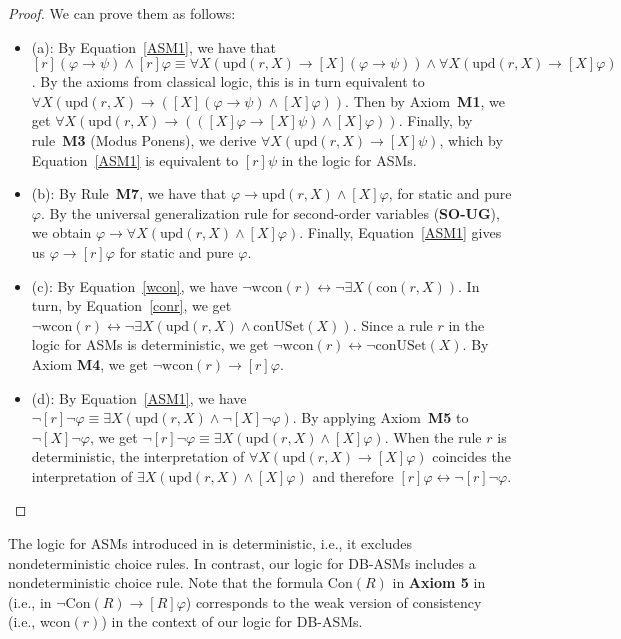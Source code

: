 \documentclass[preprint,11pt]{elsarticle}
\theoremstyle{definition}
\theoremstyle{remark}
\begin{document}
\begin{proof} We can prove them as follows:
\begin{itemize}
  \item (a): By Equation~\ref{ASM1}, we have that $[r](\varphi\rightarrow\psi)\wedge [r]\varphi \equiv \forall X (\mathrm{upd}(r,X)\rightarrow [X](\varphi\rightarrow\psi)) \wedge \forall X (\mathrm{upd}(r,X)\rightarrow [X]\varphi)$. By the axioms from classical logic, this is in turn equivalent to $\forall X (\mathrm{upd}(r,X)\rightarrow([X](\varphi\rightarrow\psi)\wedge[X]\varphi))$.
Then by Axiom~\textbf{M1}, we get $\forall X (\mathrm{upd}(r,X)\rightarrow(([X]\varphi \rightarrow [X]\psi) \wedge [X]\varphi))$. Finally, by rule~\textbf{M3} (Modus Ponens), we derive $\forall X (\mathrm{upd}(r,X)\rightarrow [X]\psi)$, which by Equation~\ref{ASM1} is equivalent to $[r]\psi$ in the logic for ASMs.
  \item (b): By Rule~\textbf{M7}, we have that $\varphi\rightarrow \mathrm{upd}(r, X) \wedge [X]\varphi$, for
  static and pure $\varphi$. By the universal generalization rule for second-order variables (\textbf{SO-UG}), we obtain $\varphi\rightarrow \forall X(\mathrm{upd}(r, X) \wedge [X]\varphi)$. Finally, Equation~\ref{ASM1} gives us $\varphi\rightarrow [r]\varphi$ for static and pure $\varphi$.
  \item (c): By Equation~\ref{wcon}, we have $\neg \mathrm{wcon}(r)\leftrightarrow \neg\exists
  X (\mathrm{con}(r,X))$. In turn, by Equation~\ref{conr}, we get $\neg \mathrm{wcon}(r) \leftrightarrow \neg \exists X (\mathrm{upd}(r,X)\wedge \mathrm{conUSet}(X))$.
  Since a rule $r$ in the logic for ASMs is deterministic, we get $\neg \mathrm{wcon}(r)\leftrightarrow \neg \mathrm{conUSet}(X)$. By Axiom \textbf{M4}, we get $\neg \mathrm{wcon}(r)\rightarrow
  [r]\varphi$.
  \item (d): By Equation~\ref{ASM1}, we have $\neg[r]\neg\varphi \equiv \exists X(\mathrm{upd}(r,X)\wedge \neg[X]\neg\varphi)$. By applying Axiom~\textbf{M5} to $\neg[X]\neg\varphi$, we get
$\neg[r]\neg\varphi \equiv\exists X(\mathrm{upd}(r,X)\wedge[X]\varphi)$. When the rule $r$ is deterministic, the interpretation of $\forall X (\mathrm{upd}(r,X)\rightarrow [X]\varphi)$ coincides the interpretation of $\exists X (\mathrm{upd}(r,X)\wedge [X]\varphi)$ and therefore $[r]\varphi\leftrightarrow \neg[r]\neg\varphi$.
\end{itemize}
\end{proof}

The logic for ASMs introduced in \cite{RobertLogicASM} is deterministic, i.e., it excludes nondeterministic choice rules.
In contrast, our logic for DB-ASMs includes a nondeterministic choice rule. Note that
the formula Con$(R)$ in \textbf{Axiom 5} in \cite{RobertLogicASM} (i.e.,
in $\neg$Con$(R)\rightarrow [R]\varphi$) corresponds to the weak version of consistency (i.e., wcon$(r)$)
in the context of our logic for DB-ASMs.
\end{document}

